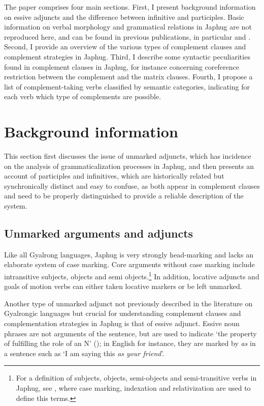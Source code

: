 \documentclass[oneside,a4paper,11pt]{article}
\begin{document}
The paper comprises four main sections. First, I present background information on essive adjuncts and the difference between infinitive and participles. Basic information on verbal morphology and grammatical relations in Japhug are not reproduced here, and can be found in previous publications, in particular \citet{jacques14linking} and \citet{jacques16relatives}. Second, I provide an overview of the various types of complement clauses and complement strategies in Japhug. Third, I describe some  syntactic peculiarities found in complement clauses in Japhug, for instance concerning coreference restriction between the complement and the matrix clauses. Fourth, I propose a list of complement-taking verbs classified by semantic categories, indicating for each verb which type of complements are possible.

\section{Background information}
This section first discusses the issue of unmarked adjuncts, which has incidence on the analysis of grammaticalization processes in Japhug, and then presents an account of participles and infinitives, which are historically related but synchronically distinct and easy to confuse, as both appear in complement clauses and need to be properly distinguished to provide a reliable description of the system.

 \subsection{Unmarked arguments and adjuncts} \label{sec:adjuncts}
Like all Gyalrong languages, Japhug is very strongly head-marking and lacks an elaborate system of case marking. Core arguments without case marking include intransitive subjects, objects and semi objects.\footnote{For a definition of subjects, objects, semi-objects and semi-transitive verbs in Japhug, see \citet{jacques16relatives}, where case marking, indexation and relativization are used to define this terms.} In addition, locative adjuncts and goals of motion verbs can either taken locative markers or be left unmarked.

Another type of unmarked adjunct not previously described in the literature on Gyalrongic languages but crucial for understanding complement clauses and complementation strategies in Japhug is that of essive adjunct. Essive noun phrases are not arguments of the sentence, but are used to indicate `the property of fulfilling the role of an N' (\citealt[606]{creissels14functive}); in English for instance, they are marked by \textit{as} in a sentence such as `I am saying this \textit{as your friend}'.
\end{document}
